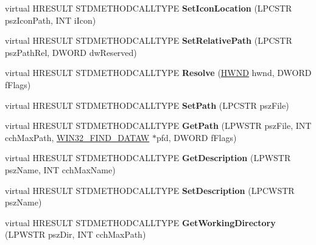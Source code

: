 \begin{DoxyCompactItemize}
virtual H\+R\+E\+S\+U\+LT S\+T\+D\+M\+E\+T\+H\+O\+D\+C\+A\+L\+L\+T\+Y\+PE {\bfseries Set\+Icon\+Location} (L\+P\+C\+S\+TR psz\+Icon\+Path, I\+NT i\+Icon)
\item 
\mbox{\label{class_c_shell_link_a39b716914a90cb8187132a8dfbcf42c7}} 
virtual H\+R\+E\+S\+U\+LT S\+T\+D\+M\+E\+T\+H\+O\+D\+C\+A\+L\+L\+T\+Y\+PE {\bfseries Set\+Relative\+Path} (L\+P\+C\+S\+TR psz\+Path\+Rel, D\+W\+O\+RD dw\+Reserved)
\item 
\mbox{\label{class_c_shell_link_a7cf52a45ed8059728954cc223343a627}} 
virtual H\+R\+E\+S\+U\+LT S\+T\+D\+M\+E\+T\+H\+O\+D\+C\+A\+L\+L\+T\+Y\+PE {\bfseries Resolve} (\hyperlink{interfacevoid}{H\+W\+ND} hwnd, D\+W\+O\+RD f\+Flags)
\item 
\mbox{\label{class_c_shell_link_a62930bcb34b1599cf4f0bc052988bc90}} 
virtual H\+R\+E\+S\+U\+LT S\+T\+D\+M\+E\+T\+H\+O\+D\+C\+A\+L\+L\+T\+Y\+PE {\bfseries Set\+Path} (L\+P\+C\+S\+TR psz\+File)
\item 
\mbox{\label{class_c_shell_link_a069b30e6c243a4cd17a5a7ffe86f3606}} 
virtual H\+R\+E\+S\+U\+LT S\+T\+D\+M\+E\+T\+H\+O\+D\+C\+A\+L\+L\+T\+Y\+PE {\bfseries Get\+Path} (L\+P\+W\+S\+TR psz\+File, I\+NT cch\+Max\+Path, \hyperlink{struct_w_i_n32___f_i_n_d___d_a_t_a_a}{W\+I\+N32\+\_\+\+F\+I\+N\+D\+\_\+\+D\+A\+T\+AW} $\ast$pfd, D\+W\+O\+RD f\+Flags)
\item 
\mbox{\label{class_c_shell_link_aaa9929bd18da8e94518a8d041d06187b}} 
virtual H\+R\+E\+S\+U\+LT S\+T\+D\+M\+E\+T\+H\+O\+D\+C\+A\+L\+L\+T\+Y\+PE {\bfseries Get\+Description} (L\+P\+W\+S\+TR psz\+Name, I\+NT cch\+Max\+Name)
\item 
\mbox{\label{class_c_shell_link_aa7eddc81523d10804d6d93d4e43ae850}} 
virtual H\+R\+E\+S\+U\+LT S\+T\+D\+M\+E\+T\+H\+O\+D\+C\+A\+L\+L\+T\+Y\+PE {\bfseries Set\+Description} (L\+P\+C\+W\+S\+TR psz\+Name)
\item 
\mbox{\label{class_c_shell_link_a4b650d8794e0259aa673bf33a43dcc74}} 
virtual H\+R\+E\+S\+U\+LT S\+T\+D\+M\+E\+T\+H\+O\+D\+C\+A\+L\+L\+T\+Y\+PE {\bfseries Get\+Working\+Directory} (L\+P\+W\+S\+TR psz\+Dir, I\+NT cch\+Max\+Path)
\item 

\end{DoxyCompactItemize}
